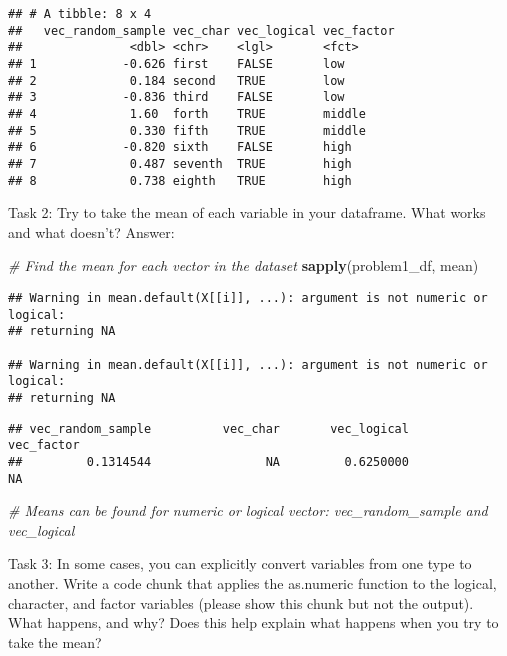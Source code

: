 \documentclass[]{article}
\newenvironment{Shaded}{\begin{snugshade}}{\end{snugshade}}
\newcommand{\CommentTok}[1]{\textcolor[rgb]{0.56,0.35,0.01}{\textit{#1}}}
\newcommand{\KeywordTok}[1]{\textcolor[rgb]{0.13,0.29,0.53}{\textbf{#1}}}
\newcommand{\NormalTok}[1]{#1}
\begin{document}
\begin{verbatim}
## # A tibble: 8 x 4
##   vec_random_sample vec_char vec_logical vec_factor
##               <dbl> <chr>    <lgl>       <fct>     
## 1            -0.626 first    FALSE       low       
## 2             0.184 second   TRUE        low       
## 3            -0.836 third    FALSE       low       
## 4             1.60  forth    TRUE        middle    
## 5             0.330 fifth    TRUE        middle    
## 6            -0.820 sixth    FALSE       high      
## 7             0.487 seventh  TRUE        high      
## 8             0.738 eighth   TRUE        high
\end{verbatim}

Task 2: Try to take the mean of each variable in your dataframe. What
works and what doesn't? Answer:

\begin{Shaded}
\begin{Highlighting}[]
\CommentTok{# Find the mean for each vector in the dataset}
\KeywordTok{sapply}\NormalTok{(problem1_df, mean)}
\end{Highlighting}
\end{Shaded}

\begin{verbatim}
## Warning in mean.default(X[[i]], ...): argument is not numeric or logical:
## returning NA

## Warning in mean.default(X[[i]], ...): argument is not numeric or logical:
## returning NA
\end{verbatim}

\begin{verbatim}
## vec_random_sample          vec_char       vec_logical        vec_factor 
##         0.1314544                NA         0.6250000                NA
\end{verbatim}

\begin{Shaded}
\begin{Highlighting}[]
\CommentTok{# Means can be found for numeric or logical vector: vec_random_sample and vec_logical}
\end{Highlighting}
\end{Shaded}

Task 3: In some cases, you can explicitly convert variables from one
type to another. Write a code chunk that applies the as.numeric function
to the logical, character, and factor variables (please show this chunk
but not the output). What happens, and why? Does this help explain what
happens when you try to take the mean?
\end{document}
